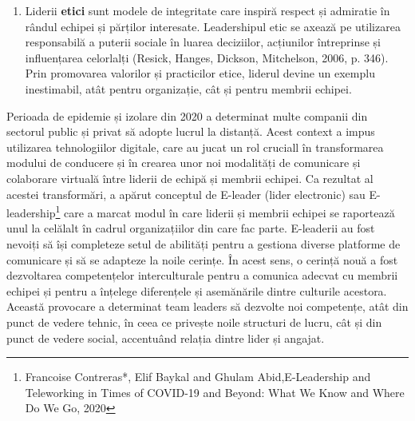 \documentclass[a4paper, 12pt]{article}
\begin{document}
\begin{enumerate}[(1)]
		\item Liderii \textbf{etici} sunt modele de integritate care inspiră respect și admiratie în rândul echipei și părților interesate. Leadershipul etic se axează pe utilizarea responsabilă a puterii sociale în luarea deciziilor, acțiunilor întreprinse și influențarea celorlalți (Resick, Hanges, Dickson, Mitchelson, 2006, p. 346). Prin promovarea valorilor și practicilor etice, liderul devine un exemplu inestimabil, atât pentru organizație, cât și pentru membrii echipei.

	\end{enumerate}


    \quad\quad Perioada de epidemie și izolare din 2020  a determinat multe companii din sectorul public și privat să adopte lucrul la distanță. Acest context a impus utilizarea tehnologiilor digitale, care au jucat un rol cruciall în transformarea modului de conducere și în crearea unor noi modalități de comunicare și colaborare virtuală între liderii de echipă și membrii echipei. Ca rezultat al acestei transformări, a apărut conceptul de E-leader (lider electronic) sau E-leadership\footnote{Francoise Contreras*, Elif Baykal and Ghulam Abid,E-Leadership and Teleworking in Times of COVID-19 and Beyond: What We Know and Where Do We Go, 2020}
 care a marcat modul în care liderii și membrii echipei se raportează unul la celălalt în cadrul organizațiilor din care fac parte. E-leaderii au fost nevoiți să își completeze setul de abilități pentru a gestiona diverse platforme de comunicare și să se adapteze la noile cerințe. În acest sens, o cerință nouă a fost dezvoltarea competențelor interculturale pentru a comunica adecvat cu membrii echipei și pentru a înțelege diferențele și asemănările dintre culturile acestora. Această provocare a determinat team leaders să dezvolte noi competențe, atât din punct de vedere tehnic, în ceea ce privește noile structuri de lucru, cât și din punct de vedere social, accentuând relația dintre lider și angajat.
\end{document}

